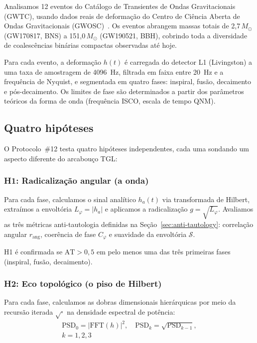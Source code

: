\documentclass[12pt,a4paper,twocolumn]{article}
\begin{document}
Analisamos 12 eventos do Catálogo de Transientes de Ondas Gravitacionais (GWTC), usando dados reais de deformação do Centro de Ciência Aberta de Ondas Gravitacionais (GWOSC)~\cite{GWOSC2023}. Os eventos abrangem massas totais de 2{,}7\,$M_\odot$ (GW170817, BNS) a 151{,}0\,$M_\odot$ (GW190521, BBH), cobrindo toda a diversidade de coalescências binárias compactas observadas até hoje.

Para cada evento, a deformação $h(t)$ é carregada do detector L1 (Livingston) a uma taxa de amostragem de 4096~Hz, filtrada em faixa entre 20~Hz e a frequência de Nyquist, e segmentada em quatro fases: inspiral, fusão, decaimento e pós-decaimento. Os limites de fase são determinados a partir dos parâmetros teóricos da forma de onda (frequência ISCO, escala de tempo QNM).

\subsection{Quatro hipóteses}

O Protocolo~\#12 testa quatro hipóteses independentes, cada uma sondando um aspecto diferente do arcabouço TGL:

\subsubsection{H1: Radicalização angular (a onda)}

Para cada fase, calculamos o sinal analítico $h_a(t)$ via transformada de Hilbert, extraímos a envoltória $L_\varphi = |h_a|$ e aplicamos a radicalização $g = \sqrt{L_\varphi}$. Avaliamos as três métricas anti-tautologia definidas na Seção~\ref{sec:anti-tautology}: correlação angular $r_{\text{ang}}$, coerência de fase $C_\varphi$ e suavidade da envoltória $\mathcal{S}$.

H1 é confirmada se $\text{AT} > 0{,}5$ em pelo menos uma das três primeiras fases (inspiral, fusão, decaimento).

\subsubsection{H2: Eco topológico (o piso de Hilbert)}
\label{sec:alpha-threshold}

Para cada fase, calculamos as dobras dimensionais hierárquicas por meio da recursão iterada $\sqrt{\cdot}$ na densidade espectral de potência:
\begin{multline}
\label{eq:hierarchical}
\text{PSD}_0 = |\text{FFT}(h)|^2, \quad \text{PSD}_k = \sqrt{\text{PSD}_{k-1}}, \\
k = 1,2,3
\end{multline}
\end{document}
